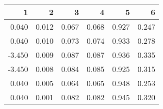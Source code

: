 \begin{table}[ht]
\centering
\begin{tabular}{rrrrrr}
  \hline
1 & 2 & 3 & 4 & 5 & 6 \\ 
  \hline
0.040 & 0.012 & 0.067 & 0.068 & 0.927 & 0.247 \\ 
  0.040 & 0.010 & 0.073 & 0.074 & 0.933 & 0.278 \\ 
  -3.450 & 0.009 & 0.087 & 0.087 & 0.936 & 0.335 \\ 
  -3.450 & 0.008 & 0.084 & 0.085 & 0.925 & 0.315 \\ 
  0.040 & 0.005 & 0.064 & 0.065 & 0.948 & 0.253 \\ 
  0.040 & 0.001 & 0.082 & 0.082 & 0.945 & 0.320 \\ 
   \hline
\end{tabular}
\end{table}
